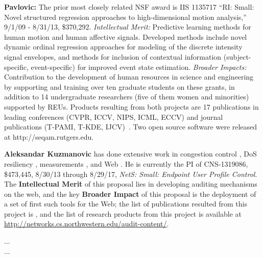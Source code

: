 {\bf Pavlovic:} The prior most closely related NSF award is IIS 1135717 “RI: Small: Novel structured regression approaches to high-dimensional motion analysis,” 9/1/09 - 8/31/13, \$370,292. \emph{Intellectual Merit:} Predictive learning methods for human motion and human affective signals. Developed methods include novel dynamic ordinal regression approaches for modeling of the discrete intensity signal envelopes, and methods for inclusion of contextual information (subject-specific, event-specific) for improved event state estimation. \emph{Broader Impacts:} Contribution to the development of human resources in science and engineering by supporting and training over ten graduate students on these grants, in addition to 14 undergraduate researchers (five of them women and minorities) supported by REUs. Products resulting from both projects are 17 publications in leading conferences (CVPR, ICCV, NIPS, ICML, ECCV) and journal publications (T-PAMI, T-KDE, IJCV)~\cite{cohen2010,Kim:2010:SOO:1927006.1927056,Shariat2011,kim11kdd,kim11pami,kim2012icpr,nicolaou12eccv,rudovic12cvpr,rudovic12eccvws,shariat12acml,yi12icpr,kim2013,rudovic13iccv,rudovic13isvc,shariat13iccv,yi13iccv,rudovic2014icvs,nicolaou14pami,yi14icpr,rudovic15pami}. Two open source software were released at http://seqam.rutgers.edu.

{\bf Aleksandar Kuzmanovic} has done extensive work in 
congestion control \cite{ecn05sigcomm,ecn05rfc,web06par,tcp-lp,tcp-lpToN,hstcp-lp,extr08ccr},
DoS resiliency \cite{receiver07jcn,friendly07infocom,dos05p2p,cache06icnp,tcpoison07icnp,shrew03sigcomm,shrewToN,aj08imc,adver10infocom},
measurements \cite{akamai06sigcomm,pong07sigmetrics,pong08icnp,KuzKni01,kuzkni-tpds,akamai08icdcs,aj08imc,google08sigcomm,serendipity09imc,p2p10infocom,geo11nsdi}, and Web \cite{geo11nsdi,migration11wi,spam13pam,selective12wi,adver11icdcs,myths10wi,ad10www,ad10infocom,myths14tweb,synthoid14wi,geoecho14wi,mosaic13sigcomm,glance13wow,fusion11,fusion13,move12www,vision12}.
He is currently the PI of CNS-1319086, \$473,445, 8/30/13 through 8/29/17, \emph{NetS: Small: Endpoint User Profile Control}. The \textbf{Intellectual Merit} of this proposal lies in developing auditing mechanisms on the web, and the key
\textbf{Broader Impact} of this proposal is the deployment of a set of first such tools for the Web; the list of publications resulted from this project is \cite{spam13pam,migration11wi,selective12wi,adver11icdcs,myths10wi,ad10www,ad10infocom,myths14tweb}, and the list of research products from this project is available at \url{http://networks.cs.northwestern.edu/audit-content/}.

...\\

...\\
